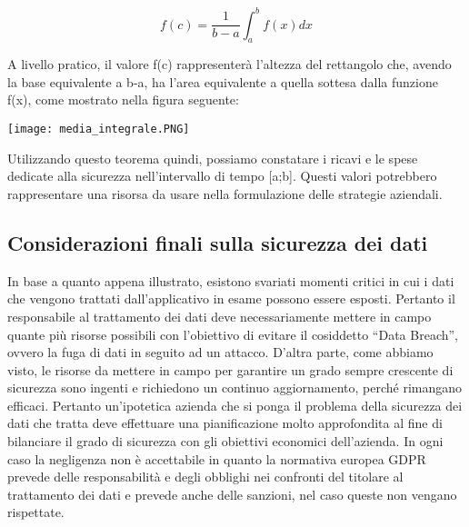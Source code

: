 \documentclass[12pt]{article}
\begin{document}
\[f(c)= \frac{1}{b-a} \int_{a}^{b} f(x)dx\]

A livello pratico, il valore f(c) rappresenterà l’altezza del rettangolo che, avendo la base equivalente a b-a, ha l’area equivalente a quella sottesa dalla funzione f(x), come mostrato nella figura seguente:

\begin{center}
    \texttt{[image: media\_integrale.PNG]}
\end{center}
\bigskip

Utilizzando questo teorema quindi, possiamo constatare i ricavi e le spese dedicate alla sicurezza nell'intervallo di tempo [a;b]. Questi valori potrebbero rappresentare una risorsa da usare nella formulazione delle strategie aziendali.

\bigskip
\subsection{Considerazioni finali sulla sicurezza dei dati}
In base a quanto appena illustrato, esistono svariati momenti critici in cui i dati che vengono trattati dall’applicativo in esame possono essere esposti.
Pertanto il responsabile al trattamento dei dati deve necessariamente mettere in campo quante più risorse possibili con l’obiettivo di evitare il cosiddetto “Data Breach”, ovvero la fuga di dati in seguito ad un attacco.
D’altra parte, come abbiamo visto, le risorse da mettere in campo per garantire un grado sempre crescente di sicurezza sono ingenti e richiedono un continuo aggiornamento, perché rimangano efficaci.
Pertanto un’ipotetica azienda che si ponga il problema della sicurezza dei dati che tratta deve effettuare una pianificazione molto approfondita al fine di bilanciare il grado di sicurezza con gli obiettivi economici dell’azienda.
In ogni caso la negligenza non è accettabile in quanto la normativa europea GDPR prevede delle responsabilità e degli obblighi nei confronti del titolare al trattamento dei dati e prevede anche delle sanzioni, nel caso queste non vengano rispettate.
\end{document}
